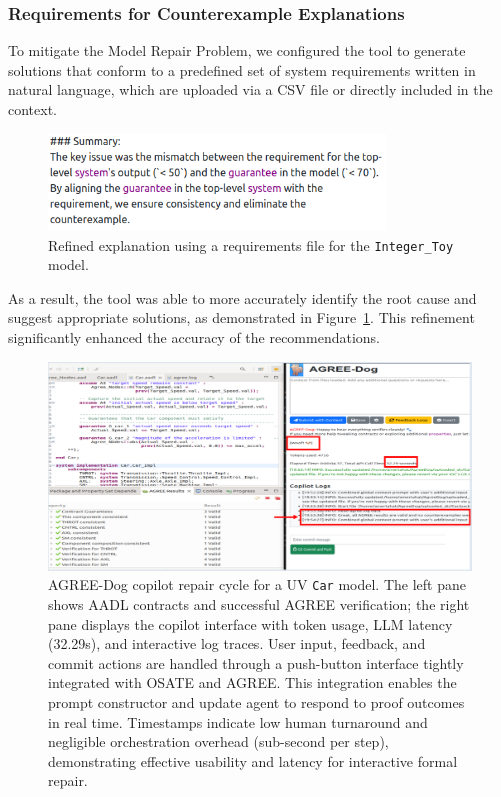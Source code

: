 \subsubsection{Requirements for Counterexample Explanations}

To mitigate the Model Repair Problem, we configured the tool to generate solutions that conform to a predefined set of system requirements written in natural language, which are uploaded via a CSV file or directly included in the context. 

\begin{figure}[t]  
    \centering
    \includegraphics[width=0.8\textwidth]{REQ-AWARE-REF-high-res.png}  
    \caption{Refined explanation using a requirements file for the \texttt{Integer\_Toy} model.}
    \label{fig:REQ-AWARE-EXPL}
\end{figure}


As a result, the tool was able to more accurately identify the root cause and suggest appropriate solutions, as demonstrated in Figure~\ref{fig:REQ-AWARE-EXPL}.
%
This refinement significantly enhanced the accuracy of the recommendations.

\begin{figure}[t]  
    \centering
    \includegraphics[height=0.6\textwidth, width=1.0\textwidth]{woof-pic-6.png}%
    \caption{AGREE-Dog copilot repair cycle for a UV \texttt{Car} model. The left pane shows AADL contracts and successful AGREE verification; the right pane displays the copilot interface with token usage, LLM latency (32.29s), and interactive log traces. User input, feedback, and commit actions are handled through a push-button interface tightly integrated with OSATE and AGREE. This integration enables the prompt constructor and update agent to respond to proof outcomes in real time. Timestamps indicate low human turnaround and negligible orchestration overhead (sub-second per step), demonstrating effective usability and latency for interactive formal repair.}
    \label{fig:Woof}
\end{figure}

